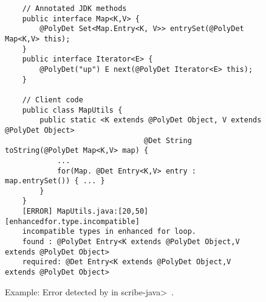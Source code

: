 \begin{figure}
    \begin{verbatim}
    // Annotated JDK methods
    public interface Map<K,V> {
        @PolyDet Set<Map.Entry<K, V>> entrySet(@PolyDet Map<K,V> this);
    }
    public interface Iterator<E> {
        @PolyDet("up") E next(@PolyDet Iterator<E> this);
    }
    
    // Client code
    public class MapUtils {
        public static <K extends @PolyDet Object, V extends @PolyDet Object> 
                                @Det String toString(@PolyDet Map<K,V> map) {
            ...
            for(Map. @Det Entry<K,V> entry : map.entrySet()) { ... }
        }
    }
    [ERROR] MapUtils.java:[20,50] [enhancedfor.type.incompatible] 
    incompatible types in enhanced for loop.
    found : @PolyDet Entry<K extends @PolyDet Object,V extends @PolyDet Object>
    required: @Det Entry<K extends @PolyDet Object,V extends @PolyDet Object>
    \end{verbatim}
    \caption{Example: Error detected by \theDeterminismChecker in \<scribe-java>~\cite{nondex}.}
    \label{code-determinism}
\end{figure}

